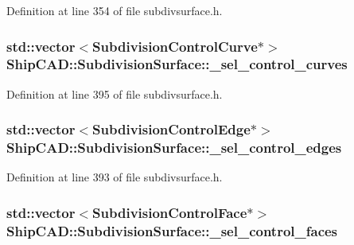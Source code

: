 Definition at line 354 of file subdivsurface.\-h.

\hypertarget{classShipCAD_1_1SubdivisionSurface_aeac6a33f098ee8dadfc9482edc1a60a5}{
\subsubsection[{\-\_\-sel\-\_\-control\-\_\-curves}]{\setlength{\rightskip}{0pt plus 5cm}std\-::vector$<${\bf Subdivision\-Control\-Curve}$\ast$$>$ Ship\-C\-A\-D\-::\-Subdivision\-Surface\-::\-\_\-sel\-\_\-control\-\_\-curves\hspace{0.3cm}{\ttfamily [protected]}}}\label{classShipCAD_1_1SubdivisionSurface_aeac6a33f098ee8dadfc9482edc1a60a5}


Definition at line 395 of file subdivsurface.\-h.

\hypertarget{classShipCAD_1_1SubdivisionSurface_a27011a827021fda5a4f2bb8828e157ca}{
\subsubsection[{\-\_\-sel\-\_\-control\-\_\-edges}]{\setlength{\rightskip}{0pt plus 5cm}std\-::vector$<${\bf Subdivision\-Control\-Edge}$\ast$$>$ Ship\-C\-A\-D\-::\-Subdivision\-Surface\-::\-\_\-sel\-\_\-control\-\_\-edges\hspace{0.3cm}{\ttfamily [protected]}}}\label{classShipCAD_1_1SubdivisionSurface_a27011a827021fda5a4f2bb8828e157ca}


Definition at line 393 of file subdivsurface.\-h.

\hypertarget{classShipCAD_1_1SubdivisionSurface_a612889fd7e746cca042c63b2ab2cd110}{
\subsubsection[{\-\_\-sel\-\_\-control\-\_\-faces}]{\setlength{\rightskip}{0pt plus 5cm}std\-::vector$<${\bf Subdivision\-Control\-Face}$\ast$$>$ Ship\-C\-A\-D\-::\-Subdivision\-Surface\-::\-\_\-sel\-\_\-control\-\_\-faces\hspace{0.3cm}{\ttfamily [protected]}}}\label{classShipCAD_1_1SubdivisionSurface_a612889fd7e746cca042c63b2ab2cd110}



